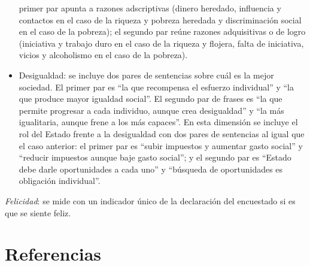 \documentclass[
  12pt,
]{book}
\begin{document}
\begin{itemize}
  primer par apunta a razones adscriptivas (dinero heredado,
  influencia y contactos en el caso de la riqueza y pobreza heredada y
  discriminación social en el caso de la pobreza); el segundo par
  reúne razones adquisitivas o de logro (iniciativa y trabajo duro en
  el caso de la riqueza y flojera, falta de iniciativa, vicios y
  alcoholismo en el caso de la pobreza).
\item
  Desigualdad: se incluye dos pares de sentencias sobre cuál es la
  mejor sociedad. El primer par es ``la que recompensa el esfuerzo
  individual'' y ``la que produce mayor igualdad social''. El segundo par
  de frases es ``la que permite progresar a cada individuo, aunque crea
  desigualdad'' y ``la más igualitaria, aunque frene a los más capaces''.
  En esta dimensión se incluye el rol del Estado frente a la
  desigualdad con dos pares de sentencias al igual que el caso
  anterior: el primer par es ``subir impuestos y aumentar gasto social''
  y ``reducir impuestos aunque baje gasto social''; y el segundo par es
  ``Estado debe darle oportunidades a cada uno'' y ``búsqueda de
  oportunidades es obligación individual''.
\end{itemize}

\emph{Felicidad}: se mide con un indicador único de la declaración del
encuestado si es que se siente feliz.

\hypertarget{referencias-4}{%
\section{Referencias}\label{referencias-4}}
\end{document}

